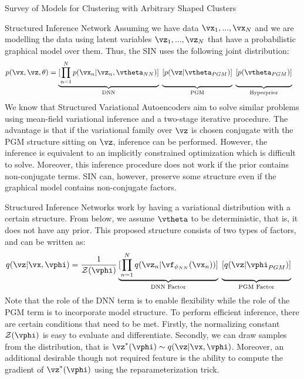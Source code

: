 \documentclass{article}
\begin{document}
\begin{psection}{Survey of Models for Clustering with Arbitrary Shaped Clusters}
\begin{psubsection}{Structured Inference Network}
		Assuming we have data $\vx_1,...,\vx_N$ and we are modelling the data using latent variables $\vz_1,...,\vz_N$ that have a probabilistic graphical model over them. Thus, the SIN uses the following joint distribution:
		\begin{align*}
			p(\vx,\vz,\theta) &= \underbrace{[\prod_{n=1}^N p(\vx_n|\vz_n,\vtheta_{NN})]}_\text{DNN}\; \underbrace{\vphantom{\prod_{n=1}^N}[p(\vz|\vtheta_{PGM})]}_\text{PGM}\; \underbrace{\vphantom{\prod_{n=1}^N}[p(\vtheta_{PGM})]}_\text{Hyperprior}
		\end{align*}
		We know that Structured Variational Autoencoders aim to solve similar problems using mean-field variational inference and a two-stage iterative procedure. The advantage is that if the variational family over $\vz$ is chosen conjugate with the PGM structure sitting on $\vz$, inference can be performed. However, the inference is equivalent to an implicitly constrained optimization which is difficult to solve. Moreover, this inference procedure does not work if the prior contains non-conjugate terms. SIN can, however, preserve some structure even if the graphical model contains non-conjugate factors.

		Structured Inference Networks work by having a variational distribution with a certain structure. From below, we assume $\vtheta$ to be deterministic, that is, it does not have any prior. This proposed structure consists of two types of factors, and can be written as:
		\begin{align*}
			q(\vz|\vx,\vphi) &= \frac{1}{\mathcal{Z}(\vphi)} \underbrace{[\prod_{n=1}^N q(\vz_n|\vf_{\phi_{NN}}(\vx_n))]}_\text{DNN Factor}\; \underbrace{\vphantom{\prod_{n=1}^N}[q(\vz|\vphi_{PGM})]}_\text{PGM Factor}
		\end{align*}
		Note that the role of the DNN term is to enable flexibility while the role of the PGM term is to incorporate model structure. To perform efficient inference, there are certain conditions that need to be met. Firstly, the normalizing constant $\mathcal{Z}(\vphi)$ is easy to evaluate and differentiate. Secondly, we can draw samples from the distribution, that is $\vz^{*}(\vphi) \sim q(\vz|\vx,\vphi)$. Moreover, an additional desirable though not required feature is the ability to compute the gradient of $\vz^{*}(\vphi)$ using the reparameterization trick.


\end{psubsection}
\end{psection}
\end{document}
